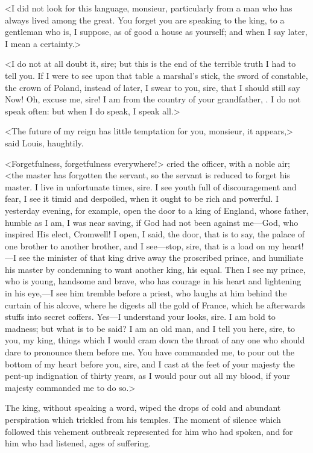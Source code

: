 <I did not look for this language, monsieur, particularly from a man who has always lived among the great. You forget you are speaking to the king, to a gentleman who is, I suppose, as of good a house as yourself; and when I say later, I mean a certainty.>

<I do not at all doubt it, sire; but this is the end of the terrible truth I had to tell you. If I were to see upon that table a marshal's stick, the sword of constable, the crown of Poland, instead of later, I swear to you, sire, that I should still say Now! Oh, excuse me, sire! I am from the country of your grandfather, . I do not speak often: but when I do speak, I speak all.>

<The future of my reign has little temptation for you, monsieur, it appears,> said Louis, haughtily.

<Forgetfulness, forgetfulness everywhere!> cried the officer, with a noble air; <the master has forgotten the servant, so the servant is reduced to forget his master. I live in unfortunate times, sire. I see youth full of discouragement and fear, I see it timid and despoiled, when it ought to be rich and powerful. I yesterday evening, for example, open the door to a king of England, whose father, humble as I am, I was near saving, if God had not been against me—God, who inspired His elect, Cromwell! I open, I said, the door, that is to say, the palace of one brother to another brother, and I see—stop, sire, that is a load on my heart!—I see the minister of that king drive away the proscribed prince, and humiliate his master by condemning to want another king, his equal. Then I see my prince, who is young, handsome and brave, who has courage in his heart and lightening in his eye,—I see him tremble before a priest, who laughs at him behind the curtain of his alcove, where he digests all the gold of France, which he afterwards stuffs into secret coffers. Yes—I understand your looks, sire. I am bold to madness; but what is to be said? I am an old man, and I tell you here, sire, to you, my king, things which I would cram down the throat of any one who should dare to pronounce them before me. You have commanded me, to pour out the bottom of my heart before you, sire, and I cast at the feet of your majesty the pent-up indignation of thirty years, as I would pour out all my blood, if your majesty commanded me to do so.>

The king, without speaking a word, wiped the drops of cold and abundant perspiration which trickled from his temples. The moment of silence which followed this vehement outbreak represented for him who had spoken, and for him who had listened, ages of suffering.

